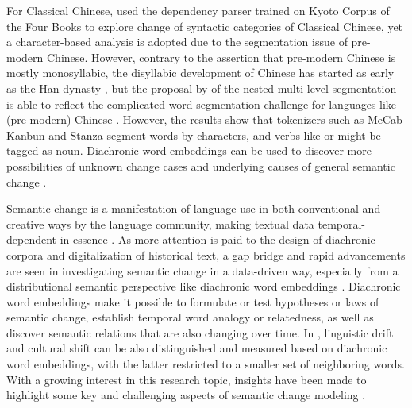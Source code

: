 For Classical Chinese, \textcite{li2020evolution} used the dependency parser trained on Kyoto Corpus of the Four Books to explore change of syntactic categories of Classical Chinese, yet a character-based analysis is adopted due to the segmentation issue of pre-modern Chinese. However, contrary to the assertion that pre-modern Chinese is mostly monosyllabic, the disyllabic development of Chinese has started as early as the Han dynasty \parencite{zhou2009,chang2008}, but the proposal by \textcite{lee2012classical} of the nested multi-level segmentation is able to reflect the complicated word segmentation challenge for languages like (pre-modern) Chinese . However, the results show that tokenizers such as MeCab-Kanbun and Stanza segment words by characters, and verbs like  or  might be tagged as noun. Diachronic word embeddings can be used to discover more possibilities of unknown change cases and underlying causes of general semantic change \parencite{hamilton2016cultural,kutuzov2017tracing,heuser2017word}.

Semantic change is a manifestation of language use in both conventional and creative ways by the language community, making textual data temporal-dependent in essence \parencite{kutuzov2018survey}. As more attention is paid to the design of diachronic corpora and digitalization of historical text, a gap bridge and rapid advancements are seen in investigating semantic change in a data-driven way, especially from a distributional semantic perspective like diachronic word embeddings \parencite{kutuzov2018survey, tahmasebi2018survey, hamilton2016law, jawahar2019contextualized}. Diachronic word embeddings make it possible to formulate or test hypotheses or laws of semantic change, establish temporal word analogy or relatedness, as well as discover semantic relations that are also changing over time. In \textcite{hamilton2016cultural}, linguistic drift and cultural shift can be also distinguished and measured based on diachronic word embeddings, with the latter restricted to a smaller set of neighboring words. With a growing interest in this research topic, insights have been made to highlight some key and challenging aspects of semantic change modeling \parencite{kutuzov2018survey,tahmasebi2018survey,camacho2018survey}.

